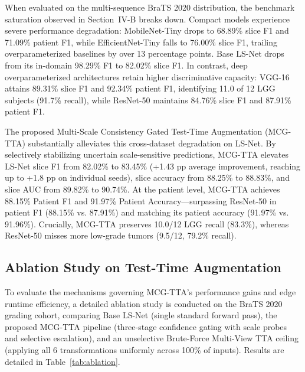 ﻿\documentclass[journal]{IEEEtran}
\begin{document}
When evaluated on the multi-sequence BraTS 2020 distribution, the benchmark saturation observed in Section~IV-B breaks down. Compact models experience severe performance degradation: MobileNet-Tiny drops to 68.89\% slice F1 and 71.09\% patient F1, while EfficientNet-Tiny falls to 76.00\% slice F1, trailing overparameterized baselines by over 13 percentage points. Base LS-Net drops from its in-domain 98.29\% F1 to 82.02\% slice F1. In contrast, deep overparameterized architectures retain higher discriminative capacity: VGG-16 attains 89.31\% slice F1 and 92.34\% patient F1, identifying 11.0 of 12 LGG subjects (91.7\% recall), while ResNet-50 maintains 84.76\% slice F1 and 87.91\% patient F1.

The proposed Multi-Scale Consistency Gated Test-Time Augmentation (MCG-TTA) substantially alleviates this cross-dataset degradation on LS-Net. By selectively stabilizing uncertain scale-sensitive predictions, MCG-TTA elevates LS-Net slice F1 from 82.02\% to 83.45\% (+1.43 pp average improvement, reaching up to +1.8 pp on individual seeds), slice accuracy from 88.25\% to 88.83\%, and slice AUC from 89.82\% to 90.74\%. At the patient level, MCG-TTA achieves 88.15\% Patient F1 and 91.97\% Patient Accuracy---surpassing ResNet-50 in patient F1 (88.15\% vs. 87.91\%) and matching its patient accuracy (91.97\% vs. 91.96\%). Crucially, MCG-TTA preserves 10.0/12 LGG recall (83.3\%), whereas ResNet-50 misses more low-grade tumors (9.5/12, 79.2\% recall).

\subsection{Ablation Study on Test-Time Augmentation}

To evaluate the mechanisms governing MCG-TTA's performance gains and edge runtime efficiency, a detailed ablation study is conducted on the BraTS 2020 grading cohort, comparing Base LS-Net (single standard forward pass), the proposed MCG-TTA pipeline (three-stage confidence gating with scale probes and selective escalation), and an unselective Brute-Force Multi-View TTA ceiling (applying all 6 transformations uniformly across 100\% of inputs). Results are detailed in Table~\ref{tab:ablation}.
\end{document}
